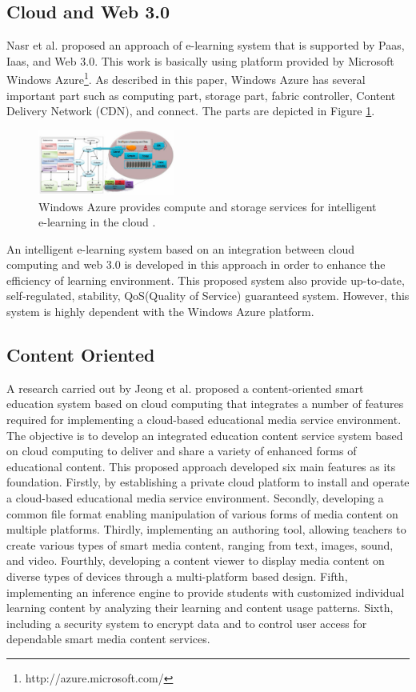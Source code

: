 \documentclass[journal]{vgtc}
\begin{document}
  
  \subsection{Cloud and Web 3.0}
  Nasr et al. \cite{nasr2012proposed} proposed an approach of e-learning system that is supported by Paas, Iaas, and Web 3.0. This work is basically using platform provided by Microsoft Windows Azure\footnote{http://azure.microsoft.com/}. As described in this paper, Windows Azure has several important part such as computing part, storage part, fabric controller, Content Delivery Network (CDN), and connect. The parts are depicted in Figure \ref{win-azure}.

  \begin{figure}[t]
    \centering
    \includegraphics[width=0.4\textwidth]{win-azure}
    \caption{Windows Azure provides compute and storage services for intelligent e-learning in the cloud \cite{nasr2012proposed}.}
    \label{win-azure}
  \end{figure}

  An intelligent e-learning system based on an integration between cloud computing and web 3.0 is developed in this approach in order to enhance the efficiency of learning environment. This proposed system also provide up-to-date, self-regulated, stability, QoS(Quality of Service) guaranteed system. However, this system is highly dependent with the Windows Azure platform.

  \subsection{Content Oriented}
  A research carried out by Jeong et al. \cite{jeong2013content,jeong2013cloud} proposed a content-oriented smart education system based on cloud computing that integrates a number of features required for implementing a cloud-based educational media service environment. The objective is to develop an integrated education content service system based on cloud computing to deliver and share a variety of enhanced forms of educational content. This proposed approach developed six main features as its foundation. Firstly, by establishing a private cloud platform to install and operate a cloud-based educational media service environment. Secondly, developing a common file format enabling manipulation of various forms of media content on multiple platforms. Thirdly, implementing an authoring tool, allowing teachers to create various types of smart media content, ranging from text, images, sound, and video. Fourthly, developing a content viewer to display media content on diverse types of devices through a multi-platform based design. Fifth, implementing an inference engine to provide students with customized individual learning content by analyzing their learning and content usage patterns. Sixth, including a security system to encrypt data and to control user access for dependable smart media content services.
\end{document}
